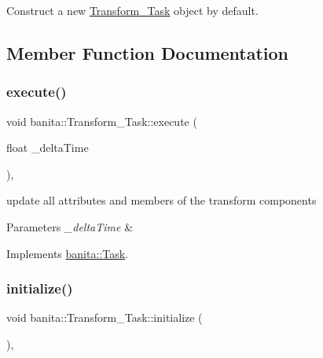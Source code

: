Construct a new \mbox{\hyperlink{classbanita_1_1_transform___task}{Transform\+\_\+\+Task}} object by default. 



\subsection{Member Function Documentation}
\mbox{\label{classbanita_1_1_transform___task_a63ce627e86225d2264093ce932706074}} 
\subsubsection{\texorpdfstring{execute()}{execute()}}
{\footnotesize\ttfamily void banita\+::\+Transform\+\_\+\+Task\+::execute (\begin{DoxyParamCaption}\item[{float}]{\+\_\+delta\+Time }\end{DoxyParamCaption})\hspace{0.3cm}{\ttfamily [override]}, {\ttfamily [virtual]}}



update all attributes and members of the transform components 


\begin{DoxyParams}{Parameters}
{\em \+\_\+delta\+Time} & \\
\hline
\end{DoxyParams}


Implements \mbox{\hyperlink{classbanita_1_1_task_aa79a45c9cbfac80ec9e4f060d5d444aa}{banita\+::\+Task}}.

\mbox{\label{classbanita_1_1_transform___task_ab94871acd76fbde7de99755cd6ac4e49}} 
\subsubsection{\texorpdfstring{initialize()}{initialize()}}
{\footnotesize\ttfamily void banita\+::\+Transform\+\_\+\+Task\+::initialize (\begin{DoxyParamCaption}{ }\end{DoxyParamCaption})\hspace{0.3cm}{\ttfamily [override]}, {\ttfamily [virtual]}}




